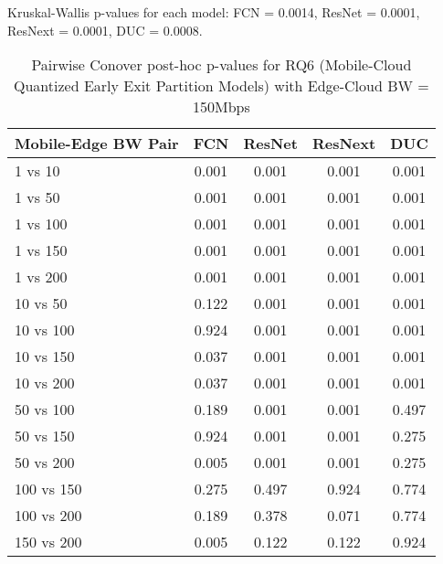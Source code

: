 \begin{table}[h]
\centering
\caption{Pairwise Conover post-hoc p-values for RQ6 (Mobile-Cloud Quantized Early Exit Partition Models) with Edge-Cloud BW = 150Mbps}
\label{tab:conover_mobile_cloud_quantized_earlyexit_partition_ec150}
\smallskip
Kruskal-Wallis p-values for each model: FCN = 0.0014, ResNet = 0.0001, ResNext = 0.0001, DUC = 0.0008.

\begin{tabular}{lcccc}
\toprule
Mobile-Edge BW Pair & FCN & ResNet & ResNext & DUC \\
\midrule
1 vs 10 & 0.001 & 0.001 & 0.001 & 0.001 \\
1 vs 50 & 0.001 & 0.001 & 0.001 & 0.001 \\
1 vs 100 & 0.001 & 0.001 & 0.001 & 0.001 \\
1 vs 150 & 0.001 & 0.001 & 0.001 & 0.001 \\
1 vs 200 & 0.001 & 0.001 & 0.001 & 0.001 \\
10 vs 50 & 0.122 & 0.001 & 0.001 & 0.001 \\
10 vs 100 & 0.924 & 0.001 & 0.001 & 0.001 \\
10 vs 150 & 0.037 & 0.001 & 0.001 & 0.001 \\
10 vs 200 & 0.037 & 0.001 & 0.001 & 0.001 \\
50 vs 100 & 0.189 & 0.001 & 0.001 & 0.497 \\
50 vs 150 & 0.924 & 0.001 & 0.001 & 0.275 \\
50 vs 200 & 0.005 & 0.001 & 0.001 & 0.275 \\
100 vs 150 & 0.275 & 0.497 & 0.924 & 0.774 \\
100 vs 200 & 0.189 & 0.378 & 0.071 & 0.774 \\
150 vs 200 & 0.005 & 0.122 & 0.122 & 0.924 \\
\bottomrule
\end{tabular}
\end{table}


